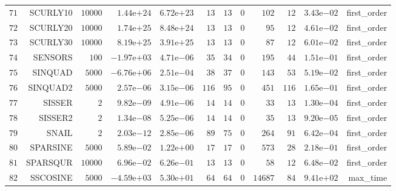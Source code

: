 \begin{longtable}{rrrrrrrrrrrr}
  \(    71\) & SCURLY10 & \( 10000\) & \( 1.44\)e\(+24\) & \( 6.72\)e\(+23\) & \(    13\) & \(    13\) & \(     0\) & \(   102\) & \(    12\) & \( 3.43\)e\(-02\) & first\_order \\
  \(    72\) & SCURLY20 & \( 10000\) & \( 1.74\)e\(+25\) & \( 8.48\)e\(+24\) & \(    13\) & \(    13\) & \(     0\) & \(    95\) & \(    12\) & \( 4.61\)e\(-02\) & first\_order \\
  \(    73\) & SCURLY30 & \( 10000\) & \( 8.19\)e\(+25\) & \( 3.91\)e\(+25\) & \(    13\) & \(    13\) & \(     0\) & \(    87\) & \(    12\) & \( 6.01\)e\(-02\) & first\_order \\
  \(    74\) & SENSORS & \(   100\) & \(-1.97\)e\(+03\) & \( 4.71\)e\(-06\) & \(    35\) & \(    34\) & \(     0\) & \(   195\) & \(    44\) & \( 1.51\)e\(-01\) & first\_order \\
  \(    75\) & SINQUAD & \(  5000\) & \(-6.76\)e\(+06\) & \( 2.51\)e\(-04\) & \(    38\) & \(    37\) & \(     0\) & \(   143\) & \(    53\) & \( 5.19\)e\(-02\) & first\_order \\
  \(    76\) & SINQUAD2 & \(  5000\) & \( 2.57\)e\(-06\) & \( 3.15\)e\(-06\) & \(   116\) & \(    95\) & \(     0\) & \(   451\) & \(   116\) & \( 1.65\)e\(-01\) & first\_order \\
  \(    77\) & SISSER & \(     2\) & \( 9.82\)e\(-09\) & \( 4.91\)e\(-06\) & \(    14\) & \(    14\) & \(     0\) & \(    33\) & \(    13\) & \( 1.30\)e\(-04\) & first\_order \\
  \(    78\) & SISSER2 & \(     2\) & \( 1.34\)e\(-08\) & \( 5.25\)e\(-06\) & \(    14\) & \(    14\) & \(     0\) & \(    35\) & \(    13\) & \( 9.20\)e\(-05\) & first\_order \\
  \(    79\) & SNAIL & \(     2\) & \( 2.03\)e\(-12\) & \( 2.85\)e\(-06\) & \(    89\) & \(    75\) & \(     0\) & \(   264\) & \(    91\) & \( 6.42\)e\(-04\) & first\_order \\
  \(    80\) & SPARSINE & \(  5000\) & \( 5.89\)e\(-02\) & \( 1.22\)e\(+00\) & \(    17\) & \(    17\) & \(     0\) & \(   573\) & \(    28\) & \( 2.18\)e\(-01\) & first\_order \\
  \(    81\) & SPARSQUR & \( 10000\) & \( 6.96\)e\(-02\) & \( 6.26\)e\(-01\) & \(    13\) & \(    13\) & \(     0\) & \(    58\) & \(    12\) & \( 6.48\)e\(-02\) & first\_order \\
  \(    82\) & SSCOSINE & \(  5000\) & \(-4.59\)e\(+03\) & \( 5.30\)e\(+01\) & \(    64\) & \(    64\) & \(     0\) & \( 14687\) & \(    84\) & \( 9.41\)e\(+02\) & max\_time \\

\end{longtable}

